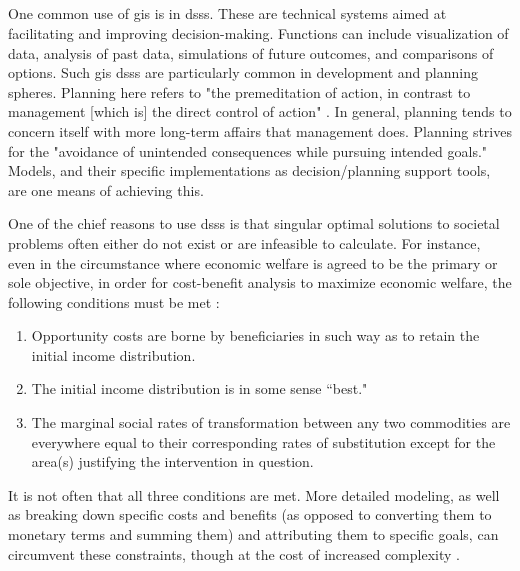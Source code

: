 \subsection{} \label{sec:scenario}

\subsubsection{}

One common use of \ac{gis} is in \acp{dss}. These are technical systems aimed at facilitating and improving decision-making. Functions can include visualization of data, analysis of past data, simulations of future outcomes, and comparisons of options. Such \ac{gis} \acp{dss} are particularly common in development and planning spheres. Planning here refers to "the premeditation of action, in contrast to management [which is] the direct control of action" \cite{harrisLocationalModelsGeographic1993}. In general, planning tends to concern itself with more long-term affairs that management does. Planning strives for the "avoidance of unintended consequences while pursuing intended goals." Models, and their specific implementations as decision/planning support tools, are one means of achieving this. 

One of the chief reasons to use \acp{dss} is that singular optimal solutions to societal problems often either do not exist or are infeasible to calculate. For instance, even in the circumstance where economic welfare is agreed to be the primary or sole objective, in order for cost-benefit analysis to maximize economic welfare, the following conditions must be met \cite{krutillaWelfareAspectsBenefitCost1961}:

\begin{enumerate}[itemsep=0pt,parsep=0pt]
	\item{Opportunity costs are borne by beneficiaries in such way as to retain the initial income distribution.}
	\item{The initial income distribution is in some sense ``best."}
	\item{The marginal social rates of transformation between any two commodities are everywhere equal to their corresponding rates of substitution except for the area(s) justifying the intervention in question.}
\end{enumerate}

It is not often that all three conditions are met. More detailed modeling, as well as breaking down specific costs and benefits (as opposed to converting them to monetary terms and summing them) and attributing them to specific goals, can circumvent these constraints, though at the cost of increased complexity \cite{hillGoalsAchievementMatrixEvaluating1972}.

